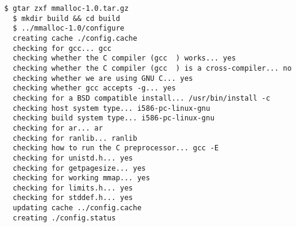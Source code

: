 %
%
%
%
%
%
%
%
%
%
%
%
%
%
%
%
%
%
%
%
%
%

\begin{lstlisting}[basicstyle=\color{white},backgroundcolor=\color{black},breaklines=true]
  $ gtar zxf mmalloc-1.0.tar.gz
  $ mkdir build && cd build
  $ ../mmalloc-1.0/configure
  creating cache ./config.cache
  checking for gcc... gcc
  checking whether the C compiler (gcc  ) works... yes
  checking whether the C compiler (gcc  ) is a cross-compiler... no
  checking whether we are using GNU C... yes
  checking whether gcc accepts -g... yes
  checking for a BSD compatible install... /usr/bin/install -c
  checking host system type... i586-pc-linux-gnu
  checking build system type... i586-pc-linux-gnu
  checking for ar... ar
  checking for ranlib... ranlib
  checking how to run the C preprocessor... gcc -E
  checking for unistd.h... yes
  checking for getpagesize... yes
  checking for working mmap... yes
  checking for limits.h... yes
  checking for stddef.h... yes
  updating cache ../config.cache
  creating ./config.status
\end{lstlisting}


